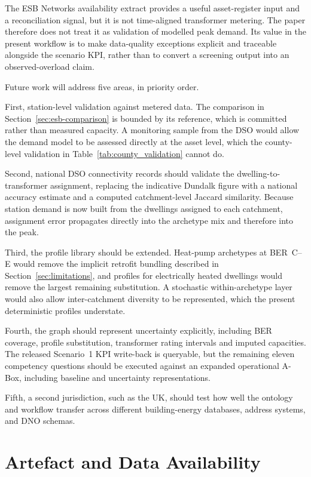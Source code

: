\documentclass[preprint,12pt]{elsarticle}
\begin{document}
The ESB Networks availability extract provides a useful asset-register input
and a reconciliation signal, but it is not time-aligned transformer metering.
The paper therefore does not treat it as validation of modelled peak demand.
Its value in the present workflow is to make data-quality exceptions explicit
and traceable alongside the scenario KPI, rather than to convert a screening
output into an observed-overload claim.

Future work will address five areas, in priority order.

First, station-level validation against metered data. The comparison in
Section~\ref{sec:esb-comparison} is bounded by its reference, which is
committed rather than measured capacity. A monitoring sample from the DSO
would allow the demand model to be assessed directly at the asset level,
which the county-level validation in Table~\ref{tab:county_validation}
cannot do.

Second, national DSO connectivity records should validate the
dwelling-to-transformer assignment, replacing the indicative Dundalk figure
with a national accuracy estimate and a computed catchment-level Jaccard
similarity. Because station demand is now built from the dwellings assigned
to each catchment, assignment error propagates directly into the archetype
mix and therefore into the peak.

Third, the profile library should be extended. Heat-pump archetypes at
BER~C--E would remove the implicit retrofit bundling described in
Section~\ref{sec:limitations}, and profiles for electrically heated
dwellings would remove the largest remaining substitution. A stochastic
within-archetype layer would also allow inter-catchment diversity to be
represented, which the present deterministic profiles understate.

Fourth, the graph should represent uncertainty explicitly, including BER
coverage, profile substitution, transformer rating intervals and imputed
capacities. The released Scenario~1 KPI write-back is queryable, but the
remaining eleven competency questions should be executed against an expanded
operational A-Box, including baseline and uncertainty representations.

Fifth, a second jurisdiction, such as the UK, should test how well the
ontology and workflow transfer across different building-energy databases,
address systems, and DNO schemas.

\section*{Artefact and Data Availability}
\end{document}
